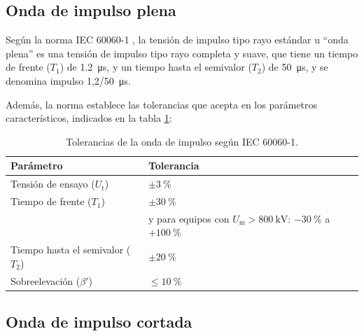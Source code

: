 \subsection{Onda de impulso plena}

Según la norma IEC 60060-1 \cite{iec60060_1}, la tensión de impulso tipo rayo estándar u \enquote{onda plena} es una tensión de impulso tipo rayo completa y suave, que tiene un tiempo de frente ($T_1$) de \qty{1,2}{\micro\second}, y un tiempo hasta el semivalor ($T_2$) de \qty{50}{\micro\second}, y se denomina impulso \qty[parse-numbers=false]{1,2/50}{\micro\second}.

Además, la norma establece las tolerancias que acepta en los parámetros característicos, indicados en la tabla \ref{tab:tolerancias_impulso}:

\vspace{3\baselineskip}
\begin{table}[H]
    \centering
    \caption{Tolerancias de la onda de impulso según IEC 60060-1.}
    \label{tab:tolerancias_impulso}
    \begin{tabular}{@{}ll@{}}
        \toprule
        \textbf{Parámetro}                 & \textbf{Tolerancia}                                                                                     \\ \midrule
        Tensión de ensayo ($U_\text{t}$)   & $\pm \qty{3}{\percent}$                                                                                 \\ \midrule
        Tiempo de frente ($T_1$)           & $\pm \qty{30}{\percent}$                                                                                \\
                                           & y para equipos con $U_\text{m} > \qty{800}{\kilo\volt}$: $\qty{-30}{\percent}$ a $+\qty{100}{\percent}$ \\ \midrule
        Tiempo hasta el semivalor ($T_2$)  & $\pm \qty{20}{\percent}$                                                                                \\ \midrule
        Sobreelevación ($\beta'$)          & $\le \qty{10}{\percent}$                                                                                \\ \bottomrule
    \end{tabular}
\end{table}
\vspace{3\baselineskip}

\subsection{Onda de impulso cortada}


